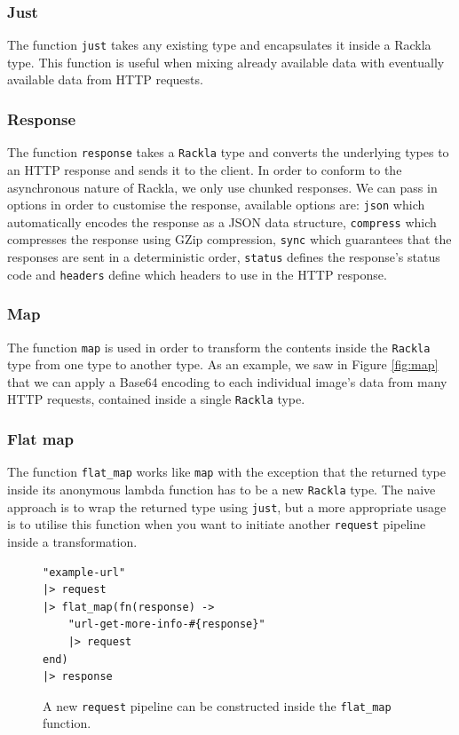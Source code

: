 \documentclass{cslthse-msc}
\begin{document}
\subsubsection{Just}
The function \lstinline{just} takes any existing type and encapsulates it inside a Rackla type. This function is useful when mixing already available data with eventually available data from HTTP requests.

\subsubsection{Response}
The function \lstinline{response} takes a \lstinline{Rackla} type and converts the underlying types to an HTTP response and sends it to the client. In order to conform to the asynchronous nature of Rackla, we only use chunked responses\cite{chunked}. We can pass in options in order to customise the response, available options are: \lstinline{json} which automatically encodes the response as a JSON data structure, \lstinline{compress} which compresses the response using GZip compression, \lstinline{sync} which guarantees that the responses are sent in a deterministic order, \lstinline{status} defines the response's status code and \lstinline{headers} define which headers to use in the HTTP response.

\subsubsection{Map}
The function \lstinline{map} is used in order to transform the contents inside the \lstinline{Rackla} type from one type to another type. As an example, we saw in Figure \ref{fig:map} that we can apply a Base64 encoding to each individual image's data from many HTTP requests, contained inside a single \lstinline{Rackla} type.

\subsubsection{Flat map}
The function \lstinline{flat_map} works like \lstinline{map} with the exception that the returned type inside its anonymous lambda function has to be a new \lstinline{Rackla} type. The naive approach is to wrap the returned type using \lstinline{just}, but a more appropriate usage is to utilise this function when you want to initiate another \lstinline{request} pipeline inside a transformation.

\begin{figure}[H]
  \centering
\begin{lstlisting}[breaklines=true,frame=single]
"example-url"
|> request
|> flat_map(fn(response) -> 
	"url-get-more-info-#{response}" 
	|> request 
end)
|> response
\end{lstlisting}
  \caption{A new \lstinline{request} pipeline can be constructed inside the \lstinline{flat_map} function.}
\end{figure}
\end{document}
